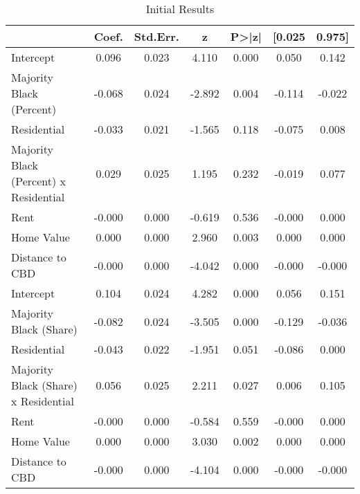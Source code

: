 \begin{table}[h]
\centering
\caption{Initial Results}
\label{tab:initial_results}
\begin{tabular}{lcccccc}
\toprule
 & Coef. & Std.Err. & z & P>|z| & [0.025 & 0.975] \\
\midrule
Intercept & 0.096 & 0.023 & 4.110 & 0.000 & 0.050 & 0.142 \\
Majority Black (Percent) & -0.068 & 0.024 & -2.892 & 0.004 & -0.114 & -0.022 \\
Residential & -0.033 & 0.021 & -1.565 & 0.118 & -0.075 & 0.008 \\
Majority Black (Percent) x Residential & 0.029 & 0.025 & 1.195 & 0.232 & -0.019 & 0.077 \\
Rent & -0.000 & 0.000 & -0.619 & 0.536 & -0.000 & 0.000 \\
Home Value & 0.000 & 0.000 & 2.960 & 0.003 & 0.000 & 0.000 \\
Distance to CBD & -0.000 & 0.000 & -4.042 & 0.000 & -0.000 & -0.000 \\
Intercept & 0.104 & 0.024 & 4.282 & 0.000 & 0.056 & 0.151 \\
Majority Black (Share) & -0.082 & 0.024 & -3.505 & 0.000 & -0.129 & -0.036 \\
Residential & -0.043 & 0.022 & -1.951 & 0.051 & -0.086 & 0.000 \\
Majority Black (Share) x Residential & 0.056 & 0.025 & 2.211 & 0.027 & 0.006 & 0.105 \\
Rent & -0.000 & 0.000 & -0.584 & 0.559 & -0.000 & 0.000 \\
Home Value & 0.000 & 0.000 & 3.030 & 0.002 & 0.000 & 0.000 \\
Distance to CBD & -0.000 & 0.000 & -4.104 & 0.000 & -0.000 & -0.000 \\
\bottomrule
\end{tabular}
\end{table}
